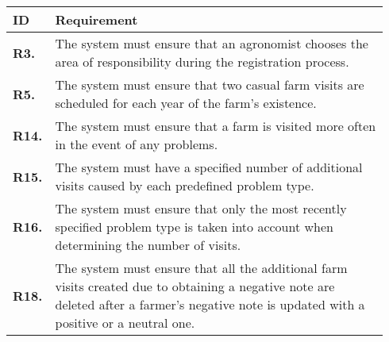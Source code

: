 \begin{longtable}{@{}p{0.06\linewidth} p{0.88\linewidth}}
	\toprule
	\textbf{ID}   & \textbf{Requirement}\\
	\midrule
	
	\textbf{R3.} & The system must ensure that an agronomist chooses the area of responsibility during the registration process. \\
	\textbf{R5.} & The system must ensure that two casual farm visits are scheduled for each year of the farm's existence.\\
	
    \textbf{R14.} & The system must ensure that a farm is visited more often in the event of any problems.\\
    \textbf{R15.} & The system must have a specified number of additional visits caused by each predefined problem type.\\
    \textbf{R16.} & The system must ensure that only the most recently specified problem type is taken into account when determining the number of visits.\\
	\textbf{R18.} & The system must ensure that all the additional farm visits created due to obtaining a negative note are deleted after a farmer's negative note is updated with a positive or a neutral one.\\
	

\end{longtable}
